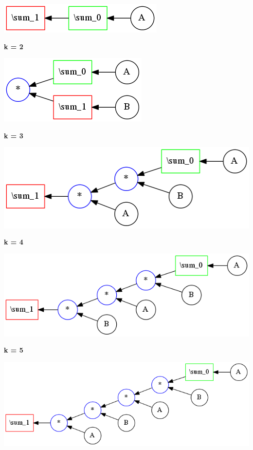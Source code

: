 
\begin{center}
\includegraphics[width=0.45\linewidth]{trees/SumAB_1_horizontal_0.png}
\end{center}


{\bf k = 2}


\begin{center}
\includegraphics[width=0.45\linewidth]{trees/SumAB_2_horizontal_0.png}
\end{center}


{\bf k = 3}


\begin{center}
\includegraphics[width=0.45\linewidth]{trees/SumAB_3_horizontal_0.png}
\end{center}


{\bf k = 4}


\begin{center}
\includegraphics[width=0.45\linewidth]{trees/SumAB_4_horizontal_0.png}
\end{center}


{\bf k = 5}


\begin{center}
\includegraphics[width=0.45\linewidth]{trees/SumAB_5_horizontal_0.png}
\end{center}


